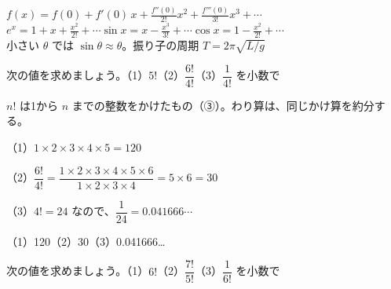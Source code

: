 {}

\begin{taisetsu}
$\displaystyle f(x)=f(0)+f'(0)\,x+\frac{f''(0)}{2!}x^2+\frac{f'''(0)}{3!}x^3+\cdots$\\
$\displaystyle e^x=1+x+\frac{x^2}{2!}+\cdots$\quad $\displaystyle\sin x=x-\frac{x^3}{3!}+\cdots$\quad $\displaystyle\cos x=1-\frac{x^2}{2!}+\cdots$\\
小さい $\theta$ では $\sin\theta\approx\theta$。振り子の周期 $T=2\pi\sqrt{L/g}$
\end{taisetsu}

\begin{kotoba}
\small
{}
\end{kotoba}


\begin{reidai}[階乗の計算]
次の値を求めましょう。\quad（1）$5!$\quad（2）$\dfrac{6!}{4!}$\quad（3）$\dfrac{1}{4!}$ を小数で\par
\kangaekata $n!$ は1から $n$ までの整数をかけたもの（③）。わり算は、同じかけ算を約分する。\par
\shiki（1）$1\times2\times3\times4\times5=120$\par
\hspace*{2.6\zw}（2）$\dfrac{6!}{4!}=\dfrac{1\times2\times3\times4\times5\times6}{1\times2\times3\times4}=5\times6=30$\par
\hspace*{2.6\zw}（3）$4!=24$ なので、$\dfrac{1}{24}=0.041666\cdots$\par
\kotae （1）120\quad（2）30\quad（3）0.041666…
\end{reidai}

\begin{jibun}
次の値を求めましょう。\quad（1）$6!$\quad（2）$\dfrac{7!}{5!}$\quad（3）$\dfrac{1}{6!}$ を小数で
\end{jibun}

